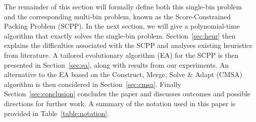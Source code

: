 \documentclass[a4paper,11pt,authoryear]{elsarticle}
\begin{document}
\noindent The remainder of this section will formally define both this single-bin problem and the corresponding multi-bin problem, known as the Score-Constrained Packing Problem (SCPP). In the next section, we will give a polynomial-time algorithm that exactly solves the single-bin problem. Section~\ref{sec:heur} then explains the difficulties associated with the SCPP and analyses existing heuristics from literature. A tailored evolutionary algorithm (EA) for the SCPP is then presented in Section~\ref{sec:ea}, along with results from our experiments. An alternative to the EA based on the Construct, Merge, Solve $\&$ Adapt (CMSA) algorithm is then considered in Section~\ref{sec:cmsa}. Finally Section~\ref{sec:conclusion} concludes the paper and discusses outcomes and possible directions for further work. A summary of the notation used in this paper is provided in Table~\ref{table:notation}.
\end{document}
